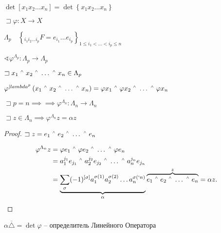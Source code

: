 \documentclass{book}
\newcommand{\ov}[1]{\overline{#1}}
\let\latexwedge\wedge
\def\wedge{\,\raisebox{0.5ex}{\ensuremath{\scriptscriptstyle\latexwedge}\,}}
\theoremstyle{definition}
\begin{document}
\begin{lemma}
    $\det \left[ x_1 x_2 \ldots x_n \right]  = \det \left\{ x_1 x_2 \ldots x_n \right\} $
\end{lemma}


\begin{definition}
$\sqsupset \varphi:X\to X$

$\Lambda_p\quad \left\{ _{i_1i_2 \ldots i_p}F = e_{i_1}\ldots e_{i_p} \right\}_{1\leqslant i_1< \ldots< i_p\leqslant n} $

$\sphericalangle \varphi^{\Lambda_p}:\Lambda_p \to \Lambda_p$

$\sqsupset x_1\wedge x_2\wedge \ldots \wedge x_n \in \Lambda_p$

$\varphi^{|lambda^p}\left( x_1\wedge x_2\wedge \ldots \wedge x_n \right)  = \varphi x_1 \wedge \varphi x_2 \wedge \ldots\wedge \varphi x_n$
\end{definition}

$\sqsupset p = n \implies  \implies \varphi^{\Lambda_n}:\Lambda_n \to \Lambda_n$

\begin{lemma}
    $\sqsupset z\in \Lambda_n \implies \varphi^{\Lambda_n}z = \alpha z$
\end{lemma}
\begin{proof}
    $\sqsupset z = e_1\wedge e_2\wedge \ldots \wedge e_n$

    \begin{align*}
        \varphi^{\Lambda_n}z &= \varphi e_1\wedge \varphi e_2 \wedge \ldots \wedge \varphi e_n\\
                             &= a_1^{j_1}e_{j_1}\wedge a_2^{j_2}e_{j_2}\wedge \ldots \wedge a_n^{j_n}e_{j_n} \\
                             &=\underbrace{ \sum_{\sigma}(-1)^{\left[ \sigma \right] }a_1^{\sigma(1)}a_2^{\sigma(2)}\ldots a_n^{\sigma(`n)}}_{\alpha} \overbrace{e_1\wedge e_2\wedge \ldots \wedge e_n}^z = \alpha z
    .\end{align*}

\end{proof}

\begin{definition}
    $\alpha \ov{\triangle} = \det \varphi$ -- определитель Линейного Оператора 
\end{definition}
\end{document}
